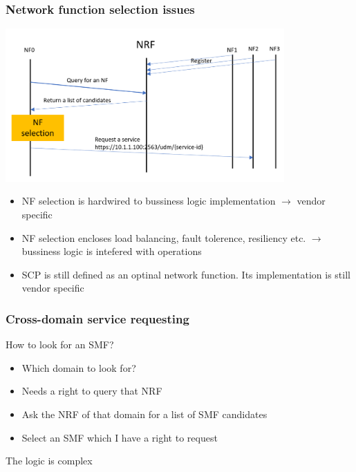 \documentclass{beamer}
\begin{document}
\begin{frame}
  \frametitle{Network function selection issues}
  \begin{center}
    \includegraphics[width=0.8\textwidth]{images/nf-selection}  
  \end{center}    
  \begin{itemize}
    \item {NF selection is hardwired to bussiness logic implementation $\rightarrow$ vendor specific}
    \item {NF selection encloses load balancing, fault tolerence, resiliency etc. $\rightarrow$ bussiness logic is intefered with operations}
    \item {SCP is still defined as an optinal network function. Its implementation is still vendor specific}
  \end{itemize}
\end{frame}
\begin{frame}
  \frametitle{Cross-domain service requesting}
  How to look for an SMF?
  \begin{itemize}
    \item Which domain to look for?
    \item Needs a right to query that NRF
    \item Ask the NRF of that domain for a list of SMF candidates
    \item Select an SMF which I have a right to request
  \end{itemize}
  The logic is complex
\end{frame}
\end{document}
